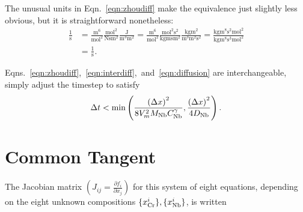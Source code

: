 \documentclass[10pt]{article}
\begin{document}
		The unusual units in Eqn.~\ref{eqn:zhoudiff} make the equivalence just slightly less obvious,
		but it is straightforward nonetheless:
		\begin{align*}
			\frac{1}{\si{\second}} &= \frac{\si{\meter^6}}{\si{\square\mole}}
			                          \frac{\si{\square\mole}}{\si{\newton\second\square\meter}}
			                          \frac{\si{\joule}}{\si{\cubic\meter\square\meter}}
			                       = \frac{\si{\meter^6}}{\si{\square\mole}}
			                          \frac{\si{\square\mole\square\second}}{\si{\kilo\gram\meter\second\square\meter}}
			                          \frac{\si{\kilo\gram\square\meter}}{\si{\cubic\meter\square\meter\square\second}}
			                       = \frac{\si{\kilo\gram\meter\tothe8\square\second\square\mole}}{\si{\kilo\gram\meter\tothe8\cubic\second\square\mole}}\\
			                       &= \frac{1}{\si{\second}}.
		\end{align*}

		Eqns.~\ref{eqn:zhoudiff},~\ref{eqn:interdiff},~and~\ref{eqn:diffusion} are interchangeable, simply adjust the timestep to satisfy
		\[
			\Delta t < \mathrm{min}\left(\frac{\left({\Delta x}\right)^2}{8 V_m^2 M_{\ce{Nb}} C_{\ce{Nb}}^{\gamma}}, \frac{\left({\Delta x}\right)^2}{4 D_{\ce{Nb}}}\right).
		\]

	\section{Common Tangent}\label{app:jacobian}
		The Jacobian matrix $\left(J_{ij}=\frac{\partial f_i}{\partial x_j}\right)$ for this system of eight equations, depending on the eight unknown compositions $\{x_{\ce{Cr}}^i\}, \{x_{\ce{Nb}}^i\}$, is written
		
\end{document}
